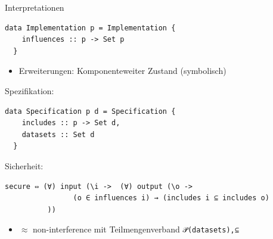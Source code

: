 \documentclass[18pt]{beamer}
\newcommand{\kit}[1]{\textcolor{kit-green100}{#1}}
\begin{document}
\begin{frame}[fragile,t]{Interpretationen}
\begin{overprint}
\begin{minipage}[t]{5cm}
\begin{verbatim}
data Implementation p = Implementation {
    influences :: p -> Set p
  }
\end{verbatim}
\end{minipage}
\begin{minipage}[t]{6cm}
\begin{itemize}
  \item Erweiterungen: Komponenteweiter Zustand (symbolisch)
\end{itemize}
\end{minipage}
\kit{Spezifikation:}
\begin{minipage}[t]{8cm}
\begin{verbatim}
data Specification p d = Specification {
    includes :: p -> Set d,
    datasets :: Set d
  }
\end{verbatim}
\end{minipage}

\kit{Sicherheit:}
\begin{minipage}[t]{8cm}
\begin{verbatim}
secure ⇔ (∀) input (\i ->  (∀) output (\o ->
                (o ∈ influences i) → (includes i ⊆ includes o)
          ))
\end{verbatim}
\end{minipage}
\begin{itemize}
  \item $\approx$ non-interference mit Teilmengenverband \texttt{𝒫(datasets),⊆}
\end{itemize}
\begin{center}

\end{center}
\end{overprint}

\end{frame}
\end{document}
